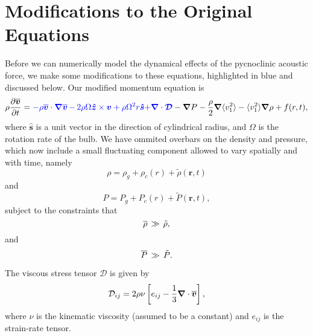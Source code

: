 
\section{Modifications to the Original Equations}
Before we can numerically model the dynamical effects of the pycnoclinic acoustic force, we make some modifications to these equations, highlighted in blue and discussed below.  Our modified momentum equation is
\begin{equation}
    \rho\frac{ \partial \vvecbar }{\partial t}   =  {\color{blue} - \rho\vvecbar\cdot\boldsymbol{\nabla}\vvecbar}
    {\color{blue} \,-\, 2\rho\Omega\boldsymbol{\hat{z}}\times\vvec  + \rho\Omega^2r\boldsymbol{\hat{s}}}
    {\color{blue} + \boldsymbol{\nabla}\cdot\boldsymbol{\mathcal{D}}}
    -\boldsymbol{\nabla}P  %
						            - \frac{\rho}{2}\boldsymbol{\nabla}\langle v_1^2\rangle
							    - \langle v_1^2\rangle\boldsymbol{\nabla}\rho
							    + f(r,t),
\end{equation}
where $\boldsymbol{\hat{s}}$ is a unit vector in the direction of cylindrical radius, and $\Omega$ is the rotation rate of the bulb. We have ommited overbars on the density and pressure, which now include a small fluctuating component allowed to vary spatially and with time, namely
\begin{equation}
\rho = \rho_g+\rho_c(r)+\tilde{\rho}(\boldsymbol{r},t)
\end{equation}
and
\begin{equation}
P = P_g+P_c(r)+\tilde{P}(\boldsymbol{r},t),
\end{equation}
subject to the constraints that
\begin{equation}
\overline{\rho} \,\gg\, \tilde{\rho},
\end{equation}
and
\begin{equation}
\overline{P} \,\gg\, \tilde{P}.
\end{equation}

The viscous stress tensor $\boldsymbol{\mathcal{D}}$ is given by
\begin{equation}
\mathcal{D}_{ij} = 2\rho\nu\left[e_{ij}-\frac{1}{3}\boldsymbol{\nabla}\cdot\overline{\boldsymbol{v}}\right],
\end{equation}
where $\nu$ is the kinematic viscosity (assumed to be a constant) and $e_{ij}$ is the strain-rate tensor.  


